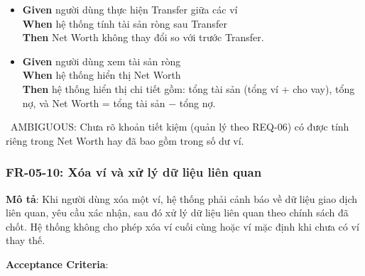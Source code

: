 \begin{itemize}
\item \textbf{Given} người dùng thực hiện Transfer giữa các ví  \\ \hspace*{1.5em}  \textbf{When} hệ thống tính tài sản ròng sau Transfer  \\ \hspace*{1.5em}  \textbf{Then} Net Worth không thay đổi so với trước Transfer.
\item \textbf{Given} người dùng xem tài sản ròng  \\ \hspace*{1.5em}  \textbf{When} hệ thống hiển thị Net Worth  \\ \hspace*{1.5em}  \textbf{Then} hệ thống hiển thị chi tiết gồm: tổng tài sản (tổng ví + cho vay), tổng nợ, và Net Worth = tổng tài sản − tổng nợ.
\end{itemize}
\warningicon\  AMBIGUOUS: Chưa rõ khoản tiết kiệm (quản lý theo REQ-06) có được tính riêng trong Net Worth hay đã bao gồm trong số dư ví.



\subsubsection{FR-05-10: Xóa ví và xử lý dữ liệu liên quan}

\textbf{Mô tả}: Khi người dùng xóa một ví, hệ thống phải cảnh báo về dữ liệu giao dịch liên quan, yêu cầu xác nhận, sau đó xử lý dữ liệu liên quan theo chính sách đã chốt. Hệ thống không cho phép xóa ví cuối cùng hoặc ví mặc định khi chưa có ví thay thế.



\textbf{Acceptance Criteria}:

